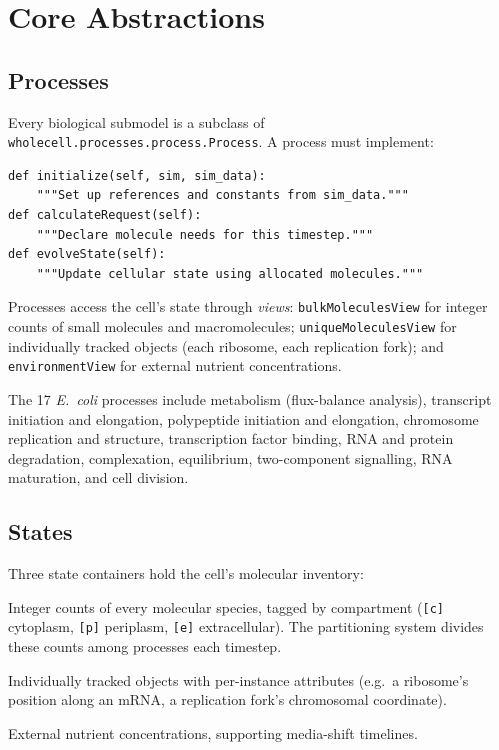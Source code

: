 \documentclass[11pt,a4paper]{article}
\begin{document}
\section{Core Abstractions}

\subsection{Processes}

Every biological submodel is a subclass of
\texttt{wholecell.processes.process.Process}.  A process must implement:

\begin{lstlisting}
def initialize(self, sim, sim_data):
    """Set up references and constants from sim_data."""
def calculateRequest(self):
    """Declare molecule needs for this timestep."""
def evolveState(self):
    """Update cellular state using allocated molecules."""
\end{lstlisting}

Processes access the cell's state through \emph{views}:
\texttt{bulkMoleculesView} for integer counts of small molecules and
macromolecules; \texttt{uniqueMoleculesView} for individually tracked objects
(each ribosome, each replication fork); and \texttt{environmentView} for
external nutrient concentrations.

The 17 \textit{E.~coli} processes include metabolism (flux-balance analysis),
transcript initiation and elongation, polypeptide initiation and elongation,
chromosome replication and structure, transcription factor binding, RNA and
protein degradation, complexation, equilibrium, two-component signalling,
RNA maturation, and cell division.

\subsection{States}

Three state containers hold the cell's molecular inventory:

\begin{description}[nosep]
  \item[\texttt{BulkMolecules}] Integer counts of every molecular species,
    tagged by compartment (\texttt{[c]} cytoplasm, \texttt{[p]} periplasm,
    \texttt{[e]} extracellular).  The partitioning system divides these counts
    among processes each timestep.
  \item[\texttt{UniqueMolecules}] Individually tracked objects with per-instance
    attributes (e.g.\ a ribosome's position along an mRNA, a replication fork's
    chromosomal coordinate).
  \item[\texttt{LocalEnvironment}] External nutrient concentrations, supporting
    media-shift timelines.
\end{description}
\end{document}
